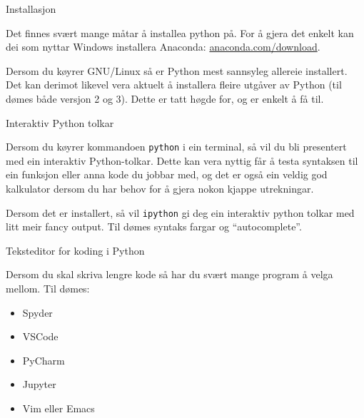 \begin{frame}{Installasjon}

  Det finnes svært mange måtar å installea python på. For å gjera det enkelt kan dei som nyttar Windows installera Anaconda: \href{https://www.anaconda.com/download/}{anaconda.com/download}.

  Dersom du køyrer GNU/Linux så er Python mest sannsyleg allereie installert. Det kan derimot likevel vera aktuelt å installera fleire utgåver av Python (til dømes både versjon 2 og 3). Dette er tatt høgde for, og er enkelt å få til.
\end{frame}

\begin{frame}{Interaktiv Python tolkar}

  Dersom du køyrer kommandoen \texttt{python} i ein terminal, så vil du bli presentert med ein interaktiv Python-tolkar. Dette kan vera nyttig får å testa syntaksen til ein funksjon eller anna kode du jobbar med, og det er også ein veldig god kalkulator dersom du har behov for å gjera nokon kjappe utrekningar.

Dersom det er installert, så vil \texttt{ipython} gi deg ein interaktiv python tolkar med litt meir fancy output. Til dømes syntaks fargar og ``autocomplete''.
  
\end{frame}

\begin{frame}{Teksteditor for koding i Python}

  Dersom du skal skriva lengre kode så har du svært mange program å velga mellom. Til dømes:
  
  \begin{itemize}
  \item Spyder
  \item VSCode
  \item PyCharm
  \item Jupyter
  \item Vim eller Emacs
  \end{itemize}
\end{frame}

